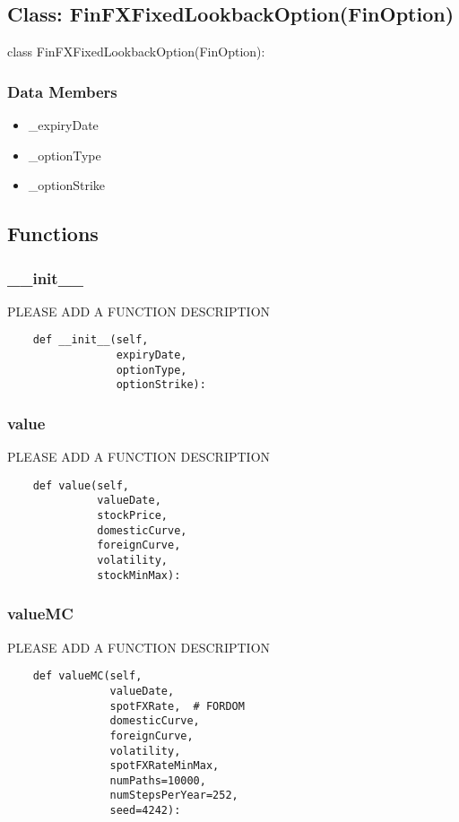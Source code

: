 \documentclass[twoside,11pt]{book}
\begin{document}
\subsection*{Class: FinFXFixedLookbackOption(FinOption)}
class FinFXFixedLookbackOption(FinOption): 

\subsubsection*{Data Members}
\begin{itemize}
\item{\_expiryDate}
\item{\_optionType}
\item{\_optionStrike}
\end{itemize}

\subsection*{Functions}

\subsubsection*{{\bf \_\_init\_\_}}
PLEASE ADD A FUNCTION DESCRIPTION

\begin{lstlisting}
    def __init__(self,
                 expiryDate,
                 optionType,
                 optionStrike):
\end{lstlisting}

\subsubsection*{{\bf value}}
PLEASE ADD A FUNCTION DESCRIPTION

\begin{lstlisting}
    def value(self,
              valueDate,
              stockPrice,
              domesticCurve,
              foreignCurve,
              volatility,
              stockMinMax):
\end{lstlisting}

\subsubsection*{{\bf valueMC}}
PLEASE ADD A FUNCTION DESCRIPTION

\begin{lstlisting}
    def valueMC(self,
                valueDate,
                spotFXRate,  # FORDOM
                domesticCurve,
                foreignCurve,
                volatility,
                spotFXRateMinMax,
                numPaths=10000,
                numStepsPerYear=252,
                seed=4242):
\end{lstlisting}
\end{document}
